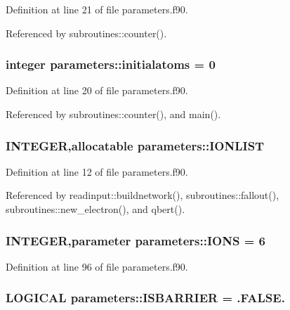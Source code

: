 Definition at line 21 of file parameters.f90.

Referenced by subroutines::counter().\hypertarget{namespaceparameters_a2a130bb0e6ad790a2a783d19749cc8ce}{
\subsubsection[{initialatoms}]{\setlength{\rightskip}{0pt plus 5cm}integer {\bf parameters::initialatoms} = 0}}
\label{namespaceparameters_a2a130bb0e6ad790a2a783d19749cc8ce}


Definition at line 20 of file parameters.f90.

Referenced by subroutines::counter(), and main().\hypertarget{namespaceparameters_a660ab08d014ed8f467dc504ed8585591}{
\subsubsection[{IONLIST}]{\setlength{\rightskip}{0pt plus 5cm}INTEGER,allocatable {\bf parameters::IONLIST}}}
\label{namespaceparameters_a660ab08d014ed8f467dc504ed8585591}


Definition at line 12 of file parameters.f90.

Referenced by readinput::buildnetwork(), subroutines::fallout(), subroutines::new\_\-electron(), and qbert().\hypertarget{namespaceparameters_a6f164e68568bd1b2cfd14c1584c3aa4a}{
\subsubsection[{IONS}]{\setlength{\rightskip}{0pt plus 5cm}INTEGER,parameter {\bf parameters::IONS} = 6}}
\label{namespaceparameters_a6f164e68568bd1b2cfd14c1584c3aa4a}


Definition at line 96 of file parameters.f90.\hypertarget{namespaceparameters_a3353739a07b03f983c7528bce590be69}{
\subsubsection[{ISBARRIER}]{\setlength{\rightskip}{0pt plus 5cm}LOGICAL {\bf parameters::ISBARRIER} = .FALSE.}}
\label{namespaceparameters_a3353739a07b03f983c7528bce590be69}


